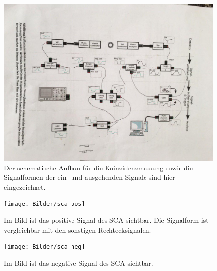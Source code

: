 \begin{figure}[h]
	\centering
	\includegraphics[scale=0.45,angle=90]{Bilder/schaltung_coinc}
	\caption[Schematischer Aufbau zur Koinzidenzmessung]{\small Der schematische Aufbau für die Koinzidenzmessung sowie die Signalformen der ein- und ausgehenden Signale sind hier eingezeichnet.}
	\label{schaltung_coinc}
\end{figure}

\begin{figure}[h]
	\centering
	\texttt{[image: Bilder/sca\_pos]}
	\caption[Positives Signal des SCA]{\small Im Bild ist das positive Signal des SCA sichtbar. Die Signalform ist vergleichbar mit den sonstigen Rechtecksignalen.}
	\label{SCA_pos}
\end{figure}

\begin{figure}[h]
	\centering
	\texttt{[image: Bilder/sca\_neg]}
	\caption[Negatives Signal des SCA]{\small Im Bild ist das negative Signal des SCA sichtbar.}
	\label{SCA_neg}
\end{figure}